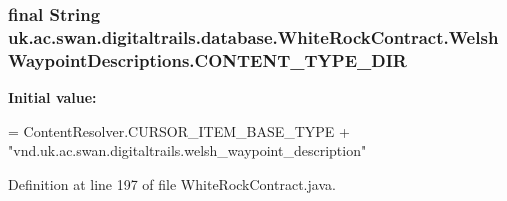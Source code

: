\hypertarget{classuk_1_1ac_1_1swan_1_1digitaltrails_1_1database_1_1_white_rock_contract_1_1_welsh_waypoint_descriptions_a4100cbe26c0e23fea1e47e565dc38930}{
\subsubsection[{C\+O\+N\+T\+E\+N\+T\+\_\+\+T\+Y\+P\+E\+\_\+\+D\+I\+R}]{\setlength{\rightskip}{0pt plus 5cm}final String uk.\+ac.\+swan.\+digitaltrails.\+database.\+White\+Rock\+Contract.\+Welsh\+Waypoint\+Descriptions.\+C\+O\+N\+T\+E\+N\+T\+\_\+\+T\+Y\+P\+E\+\_\+\+D\+I\+R\hspace{0.3cm}{\ttfamily [static]}}}\label{classuk_1_1ac_1_1swan_1_1digitaltrails_1_1database_1_1_white_rock_contract_1_1_welsh_waypoint_descriptions_a4100cbe26c0e23fea1e47e565dc38930}
{\bfseries Initial value\+:}
\begin{DoxyCode}
= ContentResolver.CURSOR\_ITEM\_BASE\_TYPE +
                \textcolor{stringliteral}{"vnd.uk.ac.swan.digitaltrails.welsh\_waypoint\_description"}
\end{DoxyCode}


Definition at line 197 of file White\+Rock\+Contract.\+java.

